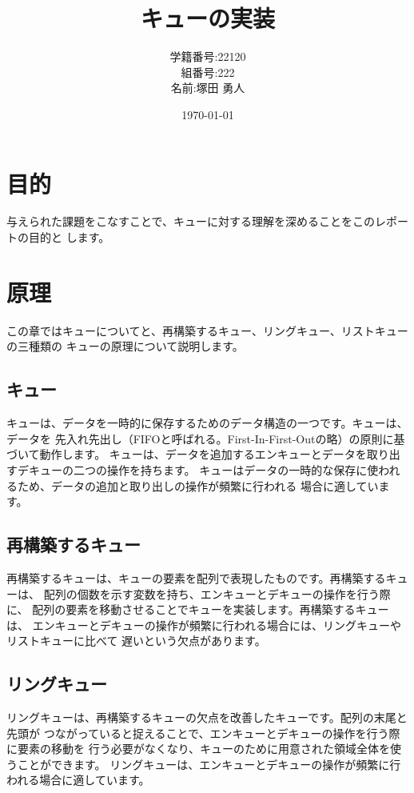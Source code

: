 \documentclass[a4j]{jarticle}
\begin{document}
\title{キューの実装}
\author{学籍番号:22120 \\ 組番号:222 \\名前:塚田 勇人}
\date{\today}
\maketitle

\newpage
\tableofcontents
\newpage

\section{目的}
与えられた課題をこなすことで、キューに対する理解を深めることをこのレポートの目的と
します。

\section{原理}
この章ではキューについてと、再構築するキュー、リングキュー、リストキューの三種類の
キューの原理について説明します。
\subsection{キュー}
キューは、データを一時的に保存するためのデータ構造の一つです。キューは、データを
先入れ先出し（FIFOと呼ばれる。First-In-First-Outの略）の原則に基づいて動作します。
キューは、データを追加するエンキューとデータを取り出すデキューの二つの操作を持ちます。
キューはデータの一時的な保存に使われるため、データの追加と取り出しの操作が頻繁に行われる
場合に適しています。

\subsection{再構築するキュー}
再構築するキューは、キューの要素を配列で表現したものです。再構築するキューは、
配列の個数を示す変数を持ち、エンキューとデキューの操作を行う際に、
配列の要素を移動させることでキューを実装します。再構築するキューは、
エンキューとデキューの操作が頻繁に行われる場合には、リングキューやリストキューに比べて
遅いという欠点があります。

\subsection{リングキュー}
リングキューは、再構築するキューの欠点を改善したキューです。配列の末尾と先頭が
つながっていると捉えることで、エンキューとデキューの操作を行う際に要素の移動を
行う必要がなくなり、キューのために用意された領域全体を使うことができます。
リングキューは、エンキューとデキューの操作が頻繁に行われる場合に適しています。
\end{document}

